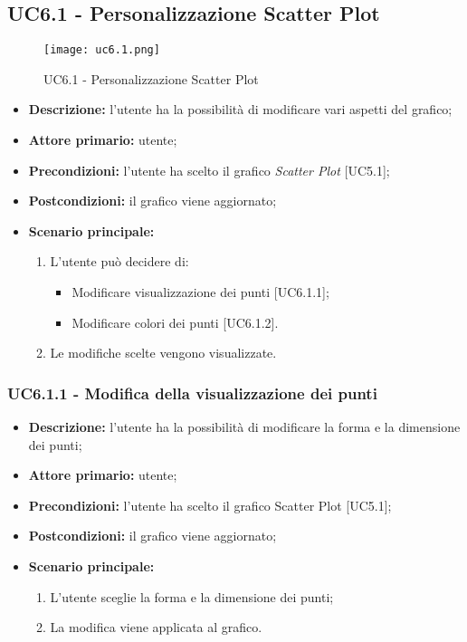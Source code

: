 \subsection{UC6.1 - Personalizzazione Scatter Plot}
\begin{figure}[H]
  \centering
  \texttt{[image: uc6.1.png]}
  \caption{UC6.1 - Personalizzazione Scatter Plot}
\end{figure}
\begin{itemize}
    \item \textbf{Descrizione:} l'utente ha la possibilità di modificare vari aspetti del grafico;
    \item \textbf{Attore primario:} utente;
    \item \textbf{Precondizioni:} l’utente ha scelto il grafico \textit{Scatter Plot} [UC5.1];
    \item \textbf{Postcondizioni:} il grafico viene aggiornato;
    \item \textbf{Scenario principale:}
    \begin{enumerate}
      \item L'utente può decidere di:
    \begin{itemize}
      \item Modificare visualizzazione dei punti [UC6.1.1];
      \item Modificare colori dei punti  [UC6.1.2].
    \end{itemize}
    \item Le modifiche scelte vengono visualizzate.
  \end{enumerate}
  \end{itemize}

    \subsubsection{UC6.1.1 - Modifica della visualizzazione dei punti}
  \begin{itemize}
    \item \textbf{Descrizione:} l'utente ha la possibilità di modificare la forma e la dimensione dei punti;
    \item \textbf{Attore primario:} utente;
    \item \textbf{Precondizioni:} l’utente ha scelto il grafico Scatter Plot [UC5.1];
    \item \textbf{Postcondizioni:} il grafico viene aggiornato;
    \item \textbf{Scenario principale:}
     \begin{enumerate}
      \item L'utente sceglie la forma e la dimensione dei punti;
      \item La modifica viene applicata al grafico.
    \end{enumerate}
  \end{itemize}

